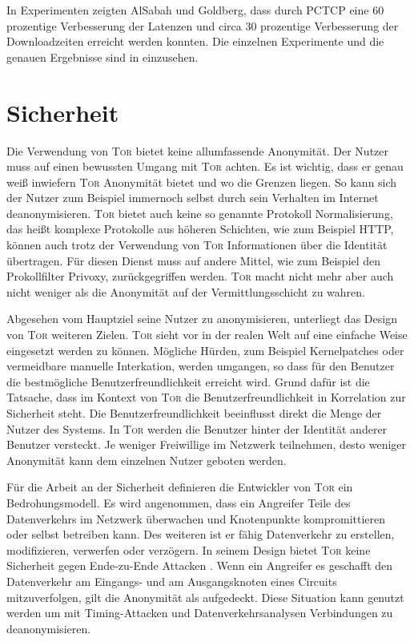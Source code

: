 \documentclass[fleqn,envcountsame,runningheads,10pt,a4paper]{llncs}
\begin{document}
In Experimenten zeigten AlSabah und Goldberg, dass durch PCTCP eine 60 prozentige Verbesserung der Latenzen und circa 30 prozentige Verbesserung der Downloadzeiten erreicht werden konnten.
Die einzelnen Experimente und die genauen Ergebnisse sind in \cite{pctcp} einzusehen.


\section{Sicherheit}
\label{sec:discussion}

Die Verwendung von \textsc{Tor} bietet keine allumfassende Anonymität. Der Nutzer muss auf einen bewussten Umgang mit \textsc{Tor} achten. Es ist wichtig, dass er genau weiß inwiefern \textsc{Tor} Anonymität bietet und wo die Grenzen liegen. So kann sich der Nutzer zum Beispiel immernoch selbst durch sein Verhalten im Internet deanonymisieren. \textsc{Tor} bietet auch keine so genannte Protokoll Normalisierung, das heißt komplexe Protokolle aus höheren Schichten, wie zum Beispiel HTTP, können auch trotz der Verwendung von \textsc{Tor} Informationen über die Identität übertragen. Für diesen Dienst muss auf andere Mittel, wie zum Beispiel den Prokollfilter Privoxy, zurückgegriffen werden. \textsc{Tor} macht nicht mehr aber auch nicht weniger als die Anonymität auf der Vermittlungsschicht zu wahren.

Abgesehen vom Hauptziel seine Nutzer zu anonymisieren, unterliegt das Design von \textsc{Tor} weiteren Zielen. \textsc{Tor} sieht vor in der realen Welt auf eine einfache Weise eingesetzt werden zu können. Mögliche Hürden, zum Beispiel Kernelpatches oder vermeidbare manuelle Interkation, werden umgangen, so dass für den Benutzer die bestmögliche Benutzerfreundlichkeit erreicht wird. Grund dafür ist die Tatsache, dass im Kontext von \textsc{Tor} die Benutzerfreundlichkeit in Korrelation zur Sicherheit steht. Die Benutzerfreundlichkeit beeinflusst direkt die Menge der Nutzer des Systems. In \textsc{Tor} werden die Benutzer hinter der Identität anderer Benutzer versteckt. Je weniger Freiwillige im Netzwerk teilnehmen, desto weniger Anonymität kann dem einzelnen Nutzer geboten werden.

Für die Arbeit an der Sicherheit definieren die Entwickler von \textsc{Tor} ein Bedrohungsmodell. Es wird angenommen, dass ein Angreifer Teile des Datenverkehrs im Netzwerk überwachen und Knotenpunkte kompromittieren oder selbst betreiben kann. Des weiteren ist er fähig Datenverkehr zu erstellen, modifizieren, verwerfen oder verzögern. In seinem Design bietet \textsc{Tor} keine Sicherheit gegen Ende-zu-Ende Attacken \cite{tor}. Wenn ein Angreifer es geschafft den Datenverkehr am Eingangs- und am Ausgangsknoten eines Circuits mitzuverfolgen, gilt die Anonymität als aufgedeckt. Diese Situation kann genutzt werden um mit Timing-Attacken und Datenverkehrsanalysen Verbindungen zu deanonymisieren.
\end{document}
